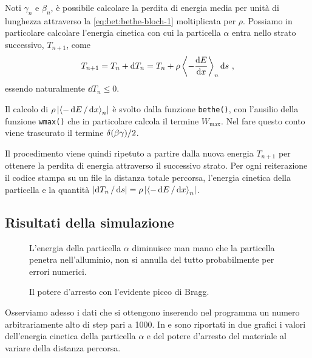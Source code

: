         Noti $\gamma_n$ e $\beta_n$, è possibile calcolare la perdita di energia media per unità di lunghezza attraverso la \eqref{eq:bet:bethe-bloch-1} moltiplicata per $\rho$. Possiamo in particolare calcolare l'energia cinetica con cui la particella $\alpha$ entra nello strato successivo, $T_{n + 1}$, come
        \begin{equation*}
            T_{n + 1} = T_n + \dd{T_n} = T_n + \rho\, {\left\langle - \dv{E}{x} \right\rangle}_n \dd{s}
            \,,
        \end{equation*}
        essendo naturalmente $\dd{T_n} \leq 0$.
        
        Il calcolo di $\rho\,\abs{{\left\langle - \dd{E} / \dd{x} \right\rangle}_n}$ è svolto dalla funzione \texttt{bethe()}, con l'ausilio della funzione \texttt{wmax()} che in particolare calcola il termine $W_\text{max}$. Nel fare questo conto viene trascurato il termine $\delta\pqty{\beta\gamma}/2$.
        
        Il procedimento viene quindi ripetuto a partire dalla nuova energia $T_{n + 1}$ per ottenere la perdita di energia attraverso il successivo strato. Per ogni reiterazione il codice stampa su un file la distanza totale percorsa, l'energia cinetica della particella e la quantità $\abs{\dd{T_n} / \dd{s}} = \rho\,\abs{{\left\langle - \dd{E} / \dd{x} \right\rangle}_n}$.

    \subsection{Risultati della simulazione}
        \begin{figure}
            \centering
            
            \caption{L'energia della particella $\alpha$ diminuisce man mano che la particella penetra nell'alluminio, non si annulla del tutto probabilmente per errori numerici.}
            \label{fig:bet:alpha-1}
        \end{figure}
        \begin{figure}
            \centering
            
            \caption{Il potere d'arresto con l'evidente picco di Bragg.}
            \label{fig:bet:alpha-2}
        \end{figure}
        Osserviamo adesso i dati che si ottengono inserendo nel programma un numero arbitrariamente alto di step pari a \num{1000}. In  e  sono riportati in due grafici i valori dell'energia cinetica della particella $\alpha$ e del potere d'arresto del materiale al variare della distanza percorsa.
        
